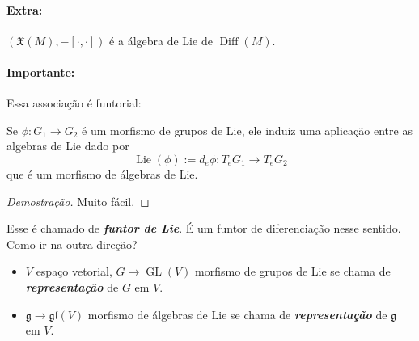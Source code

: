 \paragraph{Extra:} $(\mathfrak{X}(M),-[\cdot,\cdot ])$ \'e a \'algebra de Lie de $\operatorname{Diff}(M)$.

\paragraph{Importante:} Essa associa\c c\~ao \'e funtorial:

\begin{prop}
	Se $\phi:G_1\to G_2$ \'e um morfismo de grupos de Lie, ele induiz uma aplica\c c\~ao entre as algebras de Lie dado por
	\[\operatorname{Lie}(\phi):=d_e\phi:T_eG_1\longrightarrow T_eG_2\]
	que \'e um morfismo de \'algebras de Lie.
\end{prop}

\begin{proof}[Demostra\c c\~ao]
	Muito f\'acil.
\end{proof}

Esse \'e chamado de \textit{\textbf{funtor de Lie}}.  \'E um funtor de diferencia\c c\~ao nesse sentido. Como ir na outra dire\c c\~ao?

\begin{remark}\leavevmode 
	\begin{itemize}
	\item $V$ espaço vetorial, $G\longrightarrow \operatorname{GL}(V)$ morfismo de grupos de Lie se chama de \textit{\textbf{representa\c c\~ao}} de $G$ em $V$.
	\item $\mathfrak{g} \longrightarrow \mathfrak{gl}(V)$ morfismo de \'algebras de Lie se chama de \textit{\textbf{representa\c c\~ao}} de $\mathfrak{g}$ em $V$.
	\end{itemize}
\end{remark}

